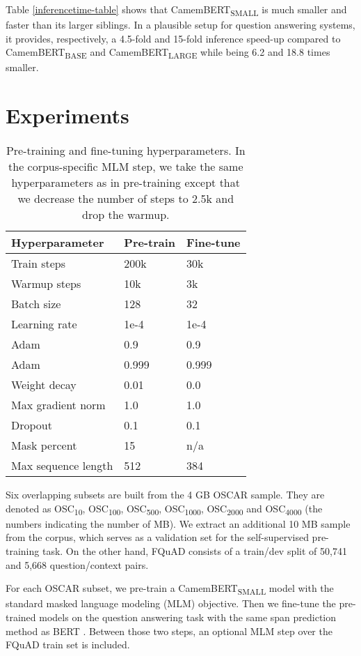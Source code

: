 \documentclass[11pt,a4paper]{article}
\begin{document}
Table \ref{inferencetime-table} shows that CamemBERT\textsubscript{SMALL} is much smaller and faster than its larger siblings. In a plausible setup for question answering systems, it provides, respectively, a 4.5-fold and 15-fold inference speed-up compared to CamemBERT\textsubscript{BASE} and CamemBERT\textsubscript{LARGE} while being 6.2 and 18.8 times smaller.

\section{Experiments} \label{experiments}

\begin{table}
\centering
\begin{tabular}{lll}
\hline \textbf{Hyperparameter} & \textbf{Pre-train} & \textbf{Fine-tune} \\ \hline
Train steps & 200k & 30k \\
Warmup steps & 10k & 3k \\
Batch size & 128 & 32 \\
Learning rate & 1e-4 & 1e-4 \\
Adam  & 0.9 & 0.9 \\
Adam  & 0.999 & 0.999 \\
Weight decay & 0.01 & 0.0 \\
Max gradient norm & 1.0 & 1.0 \\
Dropout & 0.1 & 0.1 \\
Mask percent & 15 & n/a \\
Max sequence length & 512 & 384 \\
\hline
\end{tabular}
\caption{\label{hyperparameters-table} Pre-training and fine-tuning hyperparameters. In the corpus-specific MLM step, we take the same hyperparameters as in pre-training except that we decrease the number of steps to 2.5k and drop the warmup.}
\end{table}

Six overlapping subsets are built from the 4 GB OSCAR sample. They are denoted as OSC\textsubscript{10}, OSC\textsubscript{100}, OSC\textsubscript{500}, OSC\textsubscript{1000}, OSC\textsubscript{2000} and OSC\textsubscript{4000} (the numbers indicating the number of MB). We extract an additional 10 MB sample from the corpus, which serves as a validation set for the self-supervised pre-training task. On the other hand, FQuAD consists of a train/dev split of 50,741 and 5,668 question/context pairs.

For each OSCAR subset, we pre-train a CamemBERT\textsubscript{SMALL} model with the standard masked language modeling (MLM) objective. 
Then we fine-tune the pre-trained models on the question answering task with the same span prediction method as BERT \citep{bert}. Between those two steps, an optional MLM step over the FQuAD train set is included.
\end{document}
